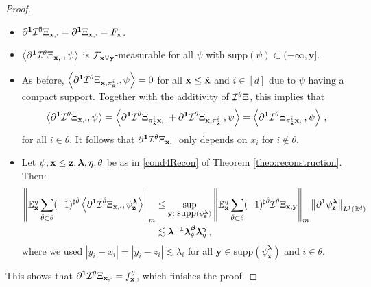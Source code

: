 \documentclass[12pt]{article}
\numberwithin{equation}{section}
\theoremstyle{plain}
\theoremstyle{definition}
\newcommand{\abs}[1]{\left\vert #1 \right\vert}
\newcommand{\scalar}[1]{\left\langle #1 \right\rangle}
\newcommand{\norm}[1]{\left\Vert #1\right\Vert}
\def\bR{\mathbb{R}}\def\bS{\mathbb{S}}
\def\bE{\mathbb{E}}\def\bW{\mathbb{W}}
\def\fy{\mathbf y}\def\fz{\mathbf z}
\def\fbeta{{\boldsymbol\beta}}
\def\fgamma{{\boldsymbol\gamma}}
\def\flambda{{\boldsymbol\lambda}}
\def\fone{{\boldsymbol 1}}
\def\supp{\mbox{supp}}
\begin{document}
\begin{proof}
    \begin{itemize}
        \item $\partial^\fone\cI^\emptyset\Xi_{\fx,\cdot} = \partial^\fone \Xi_{\fx,\cdot} = F_\fx$.
        \item $\scalar{\partial^\fone\cI^\theta\Xi_{\fx,\cdot},\psi}$ is $\cF_{\fx\vee\fy}$-measurable for all $\psi$ with $\supp(\psi)\subset(-\infty,\fy]$.
        \item As before, $\scalar{\partial^\fone \cI^\theta\Xi_{\fx,\pi^i_{\tilde\fx}\cdot},\psi} = 0$ for all $\mathbf x\le\tilde{\mathbf x}$ and $i\in[d]$ due to $\psi$ having a compact support. Together with the additivity of $\mathcal{I}^\theta\Xi$, this implies that
        \[
        \scalar{\partial^\fone\cI^\theta\Xi_{\fx,\cdot},\psi} = \scalar{\partial^\fone \cI^\theta\Xi_{\pi^i_{\tilde\fx}\fx,\cdot}+ \partial^\fone \cI^\theta\Xi_{\fx,\pi^i_{\tilde\fx}\cdot},\psi} = \scalar{\partial^\fone \cI^\theta\Xi_{\pi^i_{\tilde\fx}\fx,\cdot},\psi}\,,
        \] 
        for all $i\in\theta$. It follows that $\partial^\fone \cI^\theta\Xi_{\fx,\cdot}$ only depends on $x_i$ for $i\notin\theta$.
        \item Let $\psi,\fx\le\fz,\flambda,\eta,\theta$ be as in \eqref{cond4Recon} of Theorem \ref{theo:reconstruction}. Then:
          \begin{align*}
\norm{\bE^\eta_\fx\sum_{\hat\theta\subset\theta}(-1)^{\sharp{\hat\theta}} \scalar{\partial^\fone\cI^{\hat\theta}\Xi_{\fx,\cdot},\psi_\fz^\flambda}}_m &\le \sup_{\fy\in\supp(\psi_\fz^\flambda)}\norm{\bE^\eta_\fx \sum_{\hat\theta\subset\theta}(-1)^{\sharp{\hat\theta}} \cI^{\hat\theta}\Xi_{\fx,\fy}}_m\norm{\partial^\fone\psi_\fz^\flambda}_{L^1(\bR^d)} \\
            &\lesssim \flambda^{-\fone}\flambda^{\fbeta}_\theta\flambda^{\fgamma}_\eta\,,
        \end{align*}
        where we used $\abs{y_i-x_i} = \abs{y_i-z_i}\lesssim\lambda_i$ for all $\fy\in\supp(\psi_\fz^\flambda)$ and $i\in\theta$.
    \end{itemize}
    This shows that $\partial^\fone\cI^\theta\Xi_{\fx,\cdot} = f_\fx^\theta$, which finishes the proof.
\end{proof}
\end{document}
